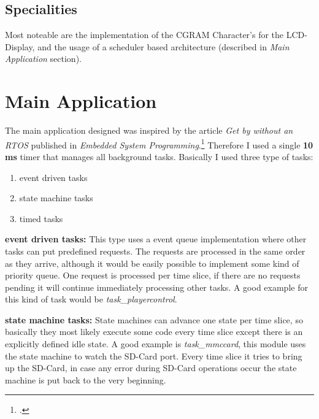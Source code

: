 \documentclass[12pt,a4paper,titlepage,oneside]{article}
\begin{document}
\subsection{Specialities}

Most noteable are the implementation of the CGRAM Character's for the LCD-Display, and the usage of a scheduler based architecture (described in {\it Main Application} section).


\section{Main Application}

The main application designed was inspired by the article {\it Get by without an RTOS } published in {\it Embedded System Programming}.\footcite{Embedded} Therefore I used a single {\bf 10 ms } timer that manages all background tasks. Basically I used three type of tasks:

\begin{enumerate}
	\item event driven tasks
	\item state machine tasks
	\item timed tasks
\end{enumerate}

{\bf event driven tasks:} This type uses a event queue implementation where other tasks can put predefined requests. The requests are processed in the same order as they arrive, although it would be easily possible to implement some kind of priority queue. One request is processed per time slice, if there are no requests pending it will continue immediately processing other tasks. A good example for this kind of task would be {\it task\_playercontrol}.

{\bf state machine tasks:} State machines can advance one state per time slice, so basically they most likely execute some code every time slice except there is an explicitly defined idle state. A good example is {\it task\_mmccard}, this module uses the state machine to watch the SD-Card port. Every time slice it tries to bring up the SD-Card, in case any error during SD-Card operations occur the state machine is put back to the very beginning.
\end{document}
